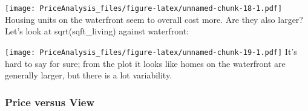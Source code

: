 \documentclass[]{article}
\newenvironment{Shaded}{\begin{snugshade}}{\end{snugshade}}
\newcommand{\KeywordTok}[1]{\textcolor[rgb]{0.13,0.29,0.53}{\textbf{#1}}}
\newcommand{\DataTypeTok}[1]{\textcolor[rgb]{0.13,0.29,0.53}{#1}}
\newcommand{\StringTok}[1]{\textcolor[rgb]{0.31,0.60,0.02}{#1}}
\newcommand{\OperatorTok}[1]{\textcolor[rgb]{0.81,0.36,0.00}{\textbf{#1}}}
\newcommand{\NormalTok}[1]{#1}
\begin{document}
\begin{Shaded}
\end{Shaded}

\texttt{[image: PriceAnalysis\_files/figure-latex/unnamed-chunk-18-1.pdf]}
Housing units on the waterfront seem to overall cost more. Are they also
larger? Let's look at sqrt(sqft\_living) against waterfront:

\begin{Shaded}
\end{Shaded}

\texttt{[image: PriceAnalysis\_files/figure-latex/unnamed-chunk-19-1.pdf]}
It's hard to say for sure; from the plot it looks like homes on the
waterfront are generally larger, but there is a lot variability.

\subsubsection{Price versus View}\label{price-versus-view}

\begin{Shaded}
\end{Shaded}
\end{document}
